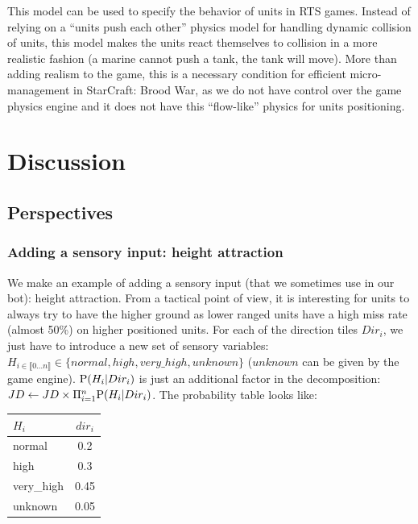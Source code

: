 This model can be used to specify the behavior of units in RTS games. Instead of relying on a ``units push each other'' physics model for handling dynamic collision of units, this model makes the units react themselves to collision in a more realistic fashion (a marine cannot push a tank, the tank will move). More than adding realism to the game, this is a necessary condition for efficient micro-management in StarCraft: Brood War, as we do not have control over the game physics engine and it does not have this ``flow-like'' physics for units positioning.

\section{Discussion}

\subsection{Perspectives}

\subsubsection{Adding a sensory input: height attraction}
We make an example of adding a sensory input (that we sometimes use in our bot): height attraction. From a tactical point of view, it is interesting for units to always try to have the higher ground as lower ranged units have a high miss rate (almost 50\%) on higher positioned units. For each of the direction tiles $Dir_i$, we just have to introduce a new set of sensory variables: $H_{i \in \llbracket 0 \dots n \rrbracket} \in \{normal, high, very\_high, unknown\}$ ($unknown$ can be given by the game engine). $\mathrm{P}(H_i|Dir_i)$ is just an additional factor in the decomposition: $JD \leftarrow JD \times \Pi_{i=1}^{n}\mathrm{P}(H_i|Dir_i)$. The probability table looks like:
\begin{center}
\begin{tabular}{|l|c|}
\hline
$H_i$ & $dir_i$ \\
\hline
normal & 0.2 \\
high & 0.3 \\
very\_high & 0.45 \\
unknown & 0.05 \\
\hline
\end{tabular}
\end{center}

